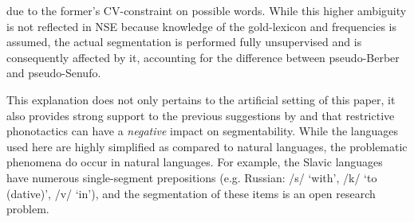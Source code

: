\documentclass[11pt]{article}
\begin{document}
due to the former's CV-constraint on possible words. While this higher ambiguity is not reflected in NSE because knowledge of the gold-lexicon and frequencies is assumed, the actual segmentation is performed fully unsupervised and is consequently affected by it, accounting for the difference between pseudo-Berber and pseudo-Senufo.

This explanation does not only pertains to the artificial setting of this paper, it also provides strong support to the previous suggestions by \cite{Daland13a} and \cite{Fourtassi13a} that restrictive phonotactics can have a \emph{negative} impact on segmentability. While the languages used here are highly simplified as compared to natural languages, the problematic phenomena do occur in natural languages. For example, the Slavic languages have numerous single-segment prepositions (e.g. Russian: /s/ `with', /k/ `to (dative)', /v/ `in'), and the segmentation of these items is an open research problem.
\end{document}
